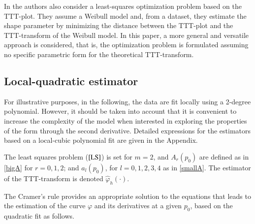 \documentclass[preprint,12pt]{elsarticle}
\begin{document}
In \cite{ZHMS2018} the authors also consider a least-squares optimization problem based on the TTT-plot. They assume a Weibull model and, from a dataset, they estimate the shape parameter by minimizing the distance between the TTT-plot and the TTT-transform of the Weibull model. In this paper, a more general and versatile approach is considered, that is, the optimization problem is formulated assuming no specific parametric form for the theoretical TTT-transform.


\subsection{Local-quadratic estimator}\label{quad}
For illustrative purposes, in the following, the data are fit locally using a 2-degree polynomial. However, it should be taken into account that it is convenient to increase the complexity of the model when interested in exploring the properties of the form through the second derivative. Detailed expressions for the estimators based on a local-cubic polynomial fit are given in the Appendix.

The least squares problem  ($\ref{LS}$) is set for $m=2$, and $A_r(p_0)$ are defined as in \eqref{bigA} for $ r=0,1,2$; and  $
a_l(p_0)$, for $ l=0, 1, 2, 3, 4$ as in \eqref{smallA}. The estimator of the TTT-transform is denoted $\widehat{\varphi}_{h}(\cdot)$. 


The Cramer's rule provides an appropriate solution to the equations that leads to the estimation of the curve $\varphi$ and its derivatives at a given $p_0$, based on the quadratic fit as follows.
\end{document}
